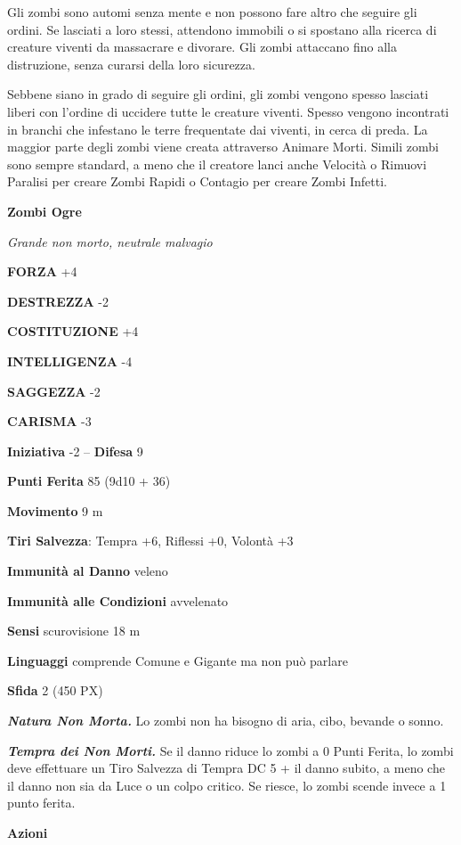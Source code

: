\begin{multicols}{2}
	Gli zombi sono automi senza mente e non possono fare altro che seguire gli ordini. Se lasciati a loro stessi, attendono immobili o si spostano alla ricerca di creature viventi da massacrare e divorare. Gli zombi attaccano fino alla distruzione, senza curarsi della loro sicurezza.

	Sebbene siano in grado di seguire gli ordini, gli zombi vengono spesso lasciati liberi con l'ordine di uccidere tutte le creature viventi. Spesso vengono incontrati in branchi che infestano le terre frequentate dai viventi, in cerca di preda. La maggior parte degli zombi viene creata attraverso Animare Morti. Simili zombi sono sempre standard, a meno che il creatore lanci anche Velocità o Rimuovi Paralisi per creare Zombi Rapidi o Contagio per creare Zombi Infetti.


	\medskip{}\textbf{Zombi Ogre}

	\textit{Grande non morto, neutrale malvagio}

	\textbf{FORZA} +4

	\textbf{DESTREZZA} -2

	\textbf{COSTITUZIONE} +4

	\textbf{INTELLIGENZA} -4

	\textbf{SAGGEZZA} -2

	\textbf{CARISMA} -3

	\textbf{Iniziativa} -2 -- \textbf{Difesa} 9

	\textbf{Punti Ferita} 85 (9d10 + 36)

	\textbf{Movimento} 9 m

	\textbf{Tiri Salvezza}: Tempra +6, Riflessi +0, Volontà +3

	\textbf{Immunità al Danno} veleno

	\textbf{Immunità alle Condizioni} avvelenato

	\textbf{Sensi} scurovisione 18 m

	\textbf{Linguaggi} comprende Comune e Gigante ma non può parlare

	\textbf{Sfida} 2 (450 PX)

	\textit{\textbf{Natura Non Morta.}} Lo zombi non ha bisogno di aria, cibo, bevande o sonno.

	\textit{\textbf{Tempra dei Non Morti.}} Se il danno riduce lo zombi a 0 Punti Ferita, lo zombi deve effettuare un Tiro Salvezza di Tempra DC 5 + il danno subito, a meno che il danno non sia da Luce o un colpo critico. Se riesce, lo zombi scende invece a 1 punto ferita.

	\textbf{Azioni}


\end{multicols}
